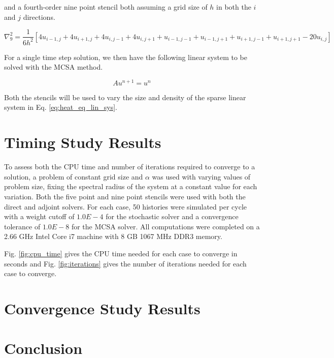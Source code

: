 \documentclass[note]{TechNote}
\begin{document}
and a fourth-order nine point stencil both assuming a grid size of $h$
in both the $i$ and $j$ directions.

\begin{equation}
  \nabla^2_9 = \frac{1}{6h^2}[4 u_{i-1,j} + 4 u_{i+1,j} + 4 u_{i,j-1}
    + 4 u_{i,j+1} + u_{i-1,j-1} + u_{i-1,j+1} + u_{i+1,j-1} +
    u_{i+1,j+1} - 20 u_{i,j}]
  \label{eq:nine_point_stencil}
\end{equation}

For a single time step solution, we then have the following linear
system to be solved with the MCSA method.

\begin{equation}
  A u^{n+1} = u^n
  \label{eq:heat_eq_lin_sys}
\end{equation}

Both the stencils will be used to vary the size and density of the
sparse linear system in Eq. \ref{eq:heat_eq_lin_sys}.

\section{Timing Study Results}
To assess both the CPU time and number of iterations required to
converge to a solution, a problem of constant grid size and $\alpha$
was used with varying values of problem size, fixing the spectral
radius of the system at a constant value for each variation. Both the
five point and nine point stencils were used with both the direct and
adjoint solvers. For each case, 50 histories were simulated per cycle
with a weight cutoff of $1.0E-4$ for the stochastic solver and a
convergence tolerance of $1.0E-8$ for the MCSA solver. All
computations were completed on a 2.66 GHz Intel Core i7 machine with 8
GB 1067 MHz DDR3 memory.

Fig. \ref{fig:cpu_time} gives the CPU time needed for each case to
converge in seconds and Fig. \ref{fig:iterations} gives the number of
iterations needed for each case to converge.



\section{Convergence Study Results}

\section{Conclusion}


% 
% 

\closing
\caution
\end{document}
